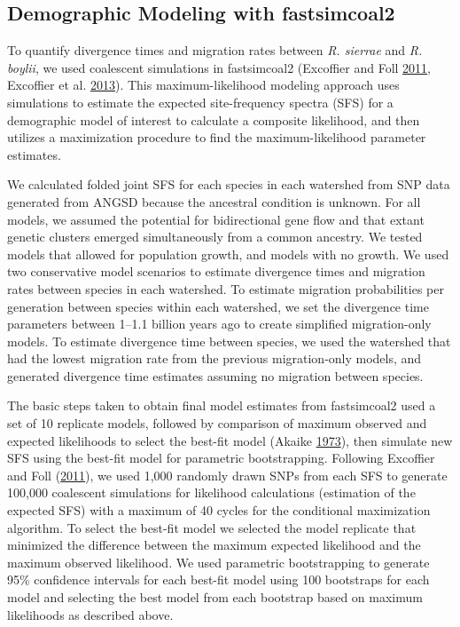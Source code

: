 \documentclass[proquest,12pt,final]{ucthesis-CA2012} %
\begin{document}
\begin{ucmainmatter}
\hypertarget{demographic-modeling-with-fastsimcoal2}{%
\subsection{Demographic Modeling with
fastsimcoal2}\label{demographic-modeling-with-fastsimcoal2}}

To quantify divergence times and migration rates between \emph{R.
sierrae} and \emph{R. boylii}, we used coalescent simulations in
fastsimcoal2 (Excoffier and Foll
\protect\hyperlink{ref-excoffier_fastsimcoal_2011}{2011}, Excoffier et
al. \protect\hyperlink{ref-excoffier_robust_2013}{2013}). This
maximum-likelihood modeling approach uses simulations to estimate the
expected site-frequency spectra (SFS) for a demographic model of
interest to calculate a composite likelihood, and then utilizes a
maximization procedure to find the maximum-likelihood parameter
estimates.

We calculated folded joint SFS for each species in each watershed from
SNP data generated from ANGSD because the ancestral condition is
unknown. For all models, we assumed the potential for bidirectional gene
flow and that extant genetic clusters emerged simultaneously from a
common ancestry. We tested models that allowed for population growth,
and models with no growth. We used two conservative model scenarios to
estimate divergence times and migration rates between species in each
watershed. To estimate migration probabilities per generation between
species within each watershed, we set the divergence time parameters
between 1--1.1 billion years ago to create simplified migration-only
models. To estimate divergence time between species, we used the
watershed that had the lowest migration rate from the previous
migration-only models, and generated divergence time estimates assuming
no migration between species.

The basic steps taken to obtain final model estimates from fastsimcoal2
used a set of 10 replicate models, followed by comparison of maximum
observed and expected likelihoods to select the best-fit model (Akaike
\protect\hyperlink{ref-akaike_information_1973}{1973}), then simulate
new SFS using the best-fit model for parametric bootstrapping. Following
Excoffier and Foll
(\protect\hyperlink{ref-excoffier_fastsimcoal_2011}{2011}), we used
1,000 randomly drawn SNPs from each SFS to generate 100,000 coalescent
simulations for likelihood calculations (estimation of the expected SFS)
with a maximum of 40 cycles for the conditional maximization algorithm.
To select the best-fit model we selected the model replicate that
minimized the difference between the maximum expected likelihood and the
maximum observed likelihood. We used parametric bootstrapping to
generate 95\% confidence intervals for each best-fit model using 100
bootstraps for each model and selecting the best model from each
bootstrap based on maximum likelihoods as described above.


\end{ucmainmatter}
\end{document}
